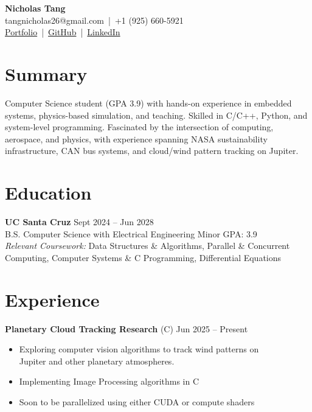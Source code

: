 \documentclass[a4paper,10pt]{article}
\begin{document}

\begin{center}
    {\LARGE \textbf{Nicholas Tang}} \\ [0.5em]
    tangnicholas26@gmail.com \,|\, +1 (925) 660-5921 \\ [0.3em]
    \href{https://nicholas-tangerine.github.io}{Portfolio} \,|\, 
    \href{https://github.com/nicholas-tangerine}{GitHub} \,|\, 
    \href{https://linkedin.com/in/nicholas-tangerine}{LinkedIn}
\end{center}

\section*{Summary}
Computer Science student (GPA 3.9) with hands-on experience in embedded
systems, physics-based simulation, and teaching. Skilled in C/C++, Python, and
system-level programming. Fascinated by the intersection of computing,
aerospace, and physics, with experience spanning NASA sustainability
infrastructure, CAN bus systems, and cloud/wind pattern tracking on Jupiter.

\section*{Education}
\textbf{UC Santa Cruz} \hfill Sept 2024 -- Jun 2028 \\
B.S. Computer Science with Electrical Engineering Minor \hfill GPA: 3.9 \\
\textit{Relevant Coursework:} Data Structures \& Algorithms, Parallel \& Concurrent \\ 
Computing, Computer Systems \& C Programming, Differential Equations

\section*{Experience}
\textbf{Planetary Cloud Tracking Research} (C) \hfill Jun 2025 -- Present
\begin{itemize}
    \item Exploring computer vision algorithms to track wind patterns on \\
        Jupiter and other planetary atmospheres.
    \item Implementing Image Processing algorithms in C
    \item Soon to be parallelized using either CUDA or compute shaders
\end{itemize}
\end{document}
